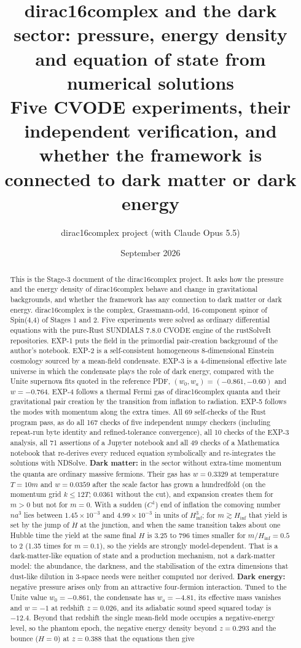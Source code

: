 \documentclass[11pt]{article}
\title{dirac16complex and the dark sector: pressure, energy density and equation of state from numerical solutions\\[0.5em]\large Five CVODE experiments, their independent verification, and whether the framework is connected to dark matter or dark energy}
\author{dirac16complex project (with Claude Opus 5.5)}
\date{September 2026}
\begin{document}
\maketitle
\tableofcontents
\newpage
\begin{abstract}
This is the Stage-3 document of the dirac16complex project. It asks how the pressure and the energy density of dirac16complex behave and change in gravitational backgrounds, and whether the framework has any connection to dark matter or dark energy. dirac16complex is the complex, Grassmann-odd, 16-component spinor of Spin(4,4) of Stages 1 and 2. Five experiments were solved as ordinary differential equations with the pure-Rust SUNDIALS 7.8.0 CVODE engine of the rustSolveIt repositories. EXP-1 puts the field in the primordial pair-creation background of the author's notebook. EXP-2 is a self-consistent homogeneous 8-dimensional Einstein cosmology sourced by a mean-field condensate. EXP-3 is a 4-dimensional effective late universe in which the condensate plays the role of dark energy, compared with the Unite supernova fits quoted in the reference PDF, $(w_0,w_a)=(-0.861,-0.60)$ and $w=-0.764$. EXP-4 follows a thermal Fermi gas of dirac16complex quanta and their gravitational pair creation by the transition from inflation to radiation. EXP-5 follows the modes with momentum along the extra times. All 69 self-checks of the Rust program pass, as do all 167 checks of five independent numpy checkers (including repeat-run byte identity and refined-tolerance convergence), all 10 checks of the EXP-3 analysis, all 71 assertions of a Jupyter notebook and all 49 checks of a Mathematica notebook that re-derives every reduced equation symbolically and re-integrates the solutions with NDSolve. \textbf{Dark matter:} in the sector without extra-time momentum the quanta are ordinary massive fermions. Their gas has $w=0.3329$ at temperature $T=10m$ and $w=0.0359$ after the scale factor has grown a hundredfold (on the momentum grid $k\le12T$; 0.0361 without the cut), and expansion creates them for $m>0$ but not for $m=0$. With a sudden ($C^1$) end of inflation the comoving number $na^3$ lies between $1.45\times10^{-3}$ and $4.99\times10^{-3}$ in units of $H_{\mathrm{inf}}^3$; for $m\gtrsim H_{\mathrm{inf}}$ that yield is set by the jump of $\dot H$ at the junction, and when the same transition takes about one Hubble time the yield at the same final $H$ is 3.25 to 796 times smaller for $m/H_{\mathrm{inf}}=0.5$ to 2 (1.35 times for $m=0.1$), so the yields are strongly model-dependent. That is a dark-matter-like equation of state and a production mechanism, not a dark-matter model: the abundance, the darkness, and the stabilisation of the extra dimensions that dust-like dilution in 3-space needs were neither computed nor derived. \textbf{Dark energy:} negative pressure arises only from an attractive four-fermion interaction. Tuned to the Unite value $w_0=-0.861$, the condensate has $w_a=-4.81$, its effective mass vanishes and $w=-1$ at redshift $z=0.026$, and its adiabatic sound speed squared today is $-12.4$. Beyond that redshift the single mean-field mode occupies a negative-energy level, so the phantom epoch, the negative energy density beyond $z=0.293$ and the bounce ($H=0$) at $z=0.388$ that the equations then give 
\end{abstract}
\end{document}
